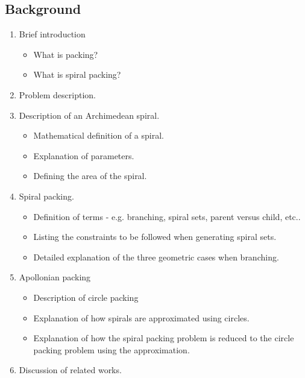 \documentclass[11pt, oneside]{article}   	%
\begin{document}
\subsection*{Background}
\begin{enumerate}
	\item Brief introduction
	\begin{itemize}
		\item What is packing?
		\item What is spiral packing?
	\end{itemize}
	\item Problem description.
	\item Description of an Archimedean spiral.
	\begin{itemize}
		\item Mathematical definition of a spiral.
		\item Explanation of parameters.
		\item Defining the area of the spiral.
	\end{itemize}

	\item Spiral packing.
	\begin{itemize}
		\item Definition of terms - e.g. branching, spiral sets, parent versus child, etc..
		\item Listing the constraints to be followed when generating spiral sets. 
		\item Detailed explanation of the three geometric cases when branching.
	\end{itemize}
	
	\item Apollonian packing
	\begin{itemize}
		\item Description of circle packing
		\item Explanation of how spirals are approximated using circles.
		\item Explanation of how the  spiral packing problem is reduced to the circle packing problem using the approximation.
	\end{itemize}
	\item Discussion of related works.
\end{enumerate}
\end{document}
